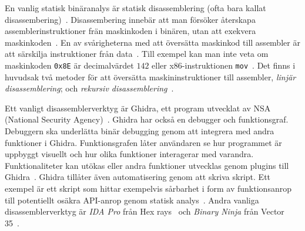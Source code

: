 En vanlig statisk binäranalys är statisk disassemblering (ofta bara kallat
disassembering)~\cite{andriesse2018}. Disassembering innebär att man försöker
återskapa assemblerinstruktioner frän maskinkoden i binären, utan att exekvera
maskinkoden~\cite{andriesse2018}. En av svårigheterna med att översätta
maskinkod till assembler är att särskilja instruktioner från
data~\cite{andriesse2018}.  Till exempel kan man inte veta om maskinkoden
\verb|0x8E| är decimalvärdet $142$ eller x86-instruktionen
\verb|mov|~\cite{andriesse2018}. Det finns i huvudsak två metoder för att
översätta maskininstruktioner till assembler, \emph{linjär disassemblering}; och
\emph{rekursiv disassemblering}~\cite{andriesse2018}.

Ett vanligt disassemblerverktyg är Ghidra, ett program utvecklat av NSA
(National Security Agency)~\cite{ghidra_website}. Ghidra har också en debugger
och funktionsgraf. Debuggern ska underlätta binär debugging genom att
integrera med andra funktioner i Ghidra. Funktionsgrafen låter användaren se
hur programmet är uppbyggt visuellt och hur olika funktioner interagerar med
varandra. Funktionaliteter kan utökas eller andra funktioner utvecklas genom
plugins till Ghidra~\cite{ghidra_use_cases}. Ghidra tillåter även automatisering
genom att skriva skript. Ett exempel är ett skript som hittar exempelvis
sårbarhet i form av funktionsanrop till potentiellt osäkra API-anrop genom
statisk analys~\cite{ghidra_script}. Andra vanliga disassemblerverktyg är
\emph{IDA Pro} från Hex rays~\cite{hex_rays} och \emph{Binary Ninja} från Vector
35~\cite{binary_ninja}.
